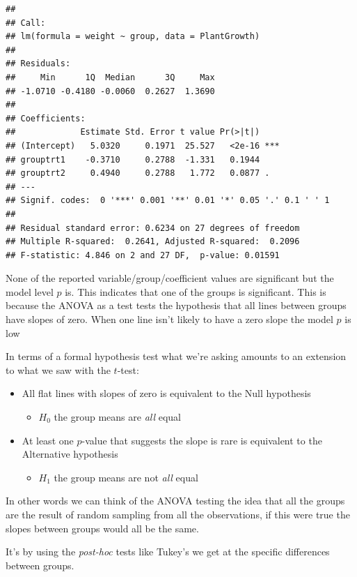 \documentclass[
]{book}
\providecommand{\tightlist}{%
  \setlength{\itemsep}{0pt}\setlength{\parskip}{0pt}}
\begin{document}
\begin{verbatim}
## 
## Call:
## lm(formula = weight ~ group, data = PlantGrowth)
## 
## Residuals:
##     Min      1Q  Median      3Q     Max 
## -1.0710 -0.4180 -0.0060  0.2627  1.3690 
## 
## Coefficients:
##             Estimate Std. Error t value Pr(>|t|)    
## (Intercept)   5.0320     0.1971  25.527   <2e-16 ***
## grouptrt1    -0.3710     0.2788  -1.331   0.1944    
## grouptrt2     0.4940     0.2788   1.772   0.0877 .  
## ---
## Signif. codes:  0 '***' 0.001 '**' 0.01 '*' 0.05 '.' 0.1 ' ' 1
## 
## Residual standard error: 0.6234 on 27 degrees of freedom
## Multiple R-squared:  0.2641,	Adjusted R-squared:  0.2096 
## F-statistic: 4.846 on 2 and 27 DF,  p-value: 0.01591
\end{verbatim}

None of the reported variable/group/coefficient values are significant but the model level \(p\) is. This indicates that one of the groups is significant. This is because the ANOVA as a test tests the hypothesis that all lines between groups have slopes of zero. When one line isn't likely to have a zero slope the model \(p\) is low

In terms of a formal hypothesis test what we're asking amounts to an extension to what we saw with the \(t\)-test:

\begin{itemize}
\tightlist
\item
  All flat lines with slopes of zero is equivalent to the Null hypothesis

  \begin{itemize}
  \tightlist
  \item
    \(H_{0}\) the group means are \emph{all} equal
  \end{itemize}
\item
  At least one \(p\)-value that suggests the slope is rare is equivalent to the Alternative hypothesis

  \begin{itemize}
  \tightlist
  \item
    \(H_{1}\) the group means are not \emph{all} equal
  \end{itemize}
\end{itemize}

In other words we can think of the ANOVA testing the idea that all the groups are the result of random sampling from all the observations, if this were true the slopes between groups would all be the same.

It's by using the \emph{post-hoc} tests like Tukey's we get at the specific differences between groups.
\end{document}
